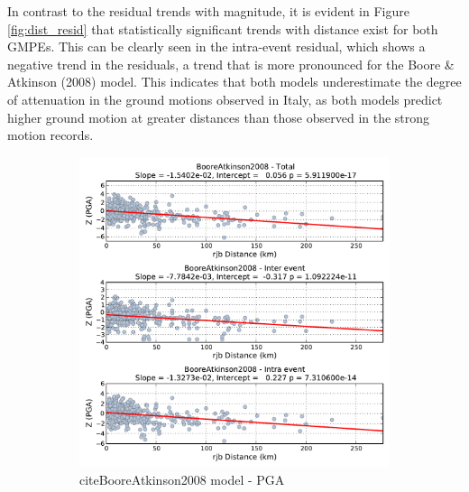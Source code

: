 In contrast to the residual trends with magnitude, it is evident in Figure \ref{fig:dist_resid} that statistically significant trends with distance exist for both GMPEs. This can be clearly seen in the intra-event residual, which shows a negative trend in the residuals, a trend that is more pronounced for the Boore \& Atkinson (2008) model. This indicates that both models underestimate the degree of attenuation in the ground motions observed in Italy, as both models predict higher ground motion at greater distances than those observed in the strong motion records. 

\begin{figure}[htb]
  \centering
  \begin{subfigure}[b]{0.49\textwidth}
      \includegraphics[width=\textwidth]{./figures/residuals/BA2008_Distance_PGA.pdf}
      \caption{citeBooreAtkinson2008 model - PGA}
      \label{fig:pga_dist_ba2008}
  \end{subfigure}
    \begin{subfigure}[b]{0.49\textwidth}

\end{subfigure}
\end{figure}
